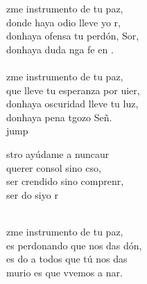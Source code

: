 \begin{cancion}%
	zme instrumento de tu paz,\\
	donde haya odio lleve yo r,\\
	donhaya ofensa tu perdón, Sor,\\
	donhaya duda nga fe en . \\
	\jump\\
	zme instrumento de tu paz,\\
	que lleve tu esperanza por uier,\\
	donhaya oscuridad lleve tu luz,\\
	donhaya pena tgozo Señ. \\jump\\
	\begin{chorus}%
	stro ayúdame a nuncaur\\
	querer  consol sino cso,\\
	ser crendido sino comprenr,\\
	ser do siyo r\\
	\end{chorus}%
	\jump\\
	zme instrumento de tu paz,\\
	es perdonando que nos das dón,\\
	es do a todos que tú nos das\\
	murio es que vvemos a nar.\\
\end{cancion}%
